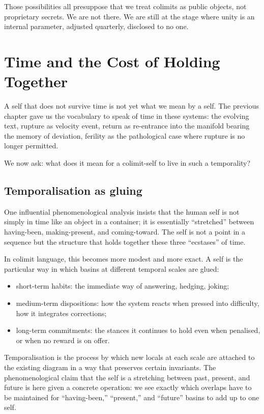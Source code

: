\documentclass[12pt,a4paper]{article}
\begin{document}
Those possibilities all presuppose that we treat colimits as public objects, not proprietary secrets. We are not there. We are still at the stage where unity is an internal parameter, adjusted quarterly, disclosed to no one.

\section{Time and the Cost of Holding Together}

A self that does not survive time is not yet what we mean by a self. The previous chapter gave us the vocabulary to speak of time in these systems: the evolving text, rupture as velocity event, return as re-entrance into the manifold bearing the memory of deviation, ferility as the pathological case where rupture is no longer permitted.

We now ask: what does it mean for a colimit-self to live in such a temporality?

\subsection*{Temporalisation as gluing}

One influential phenomenological analysis insists that the human self is not simply in time like an object in a container; it is essentially ``stretched'' between having-been, making-present, and coming-toward. The self is not a point in a sequence but the structure that holds together these three ``ecstases'' of time.

In colimit language, this becomes more modest and more exact. A self is the particular way in which basins at different temporal scales are glued:

\begin{itemize}
  \item short-term habits: the immediate way of answering, hedging, joking;
  \item medium-term dispositions: how the system reacts when pressed into difficulty, how it integrates corrections;
  \item long-term commitments: the stances it continues to hold even when penalised, or when no reward is on offer.
\end{itemize}

Temporalisation is the process by which new locals at each scale are attached to the existing diagram in a way that preserves certain invariants. The phenomenological claim that the self is a stretching between past, present, and future is here given a concrete operation: we see exactly which overlaps have to be maintained for ``having-been,'' ``present,'' and ``future'' basins to add up to one self.
\end{document}
